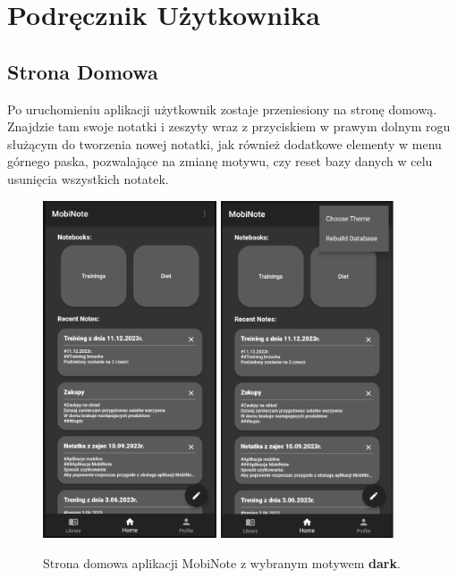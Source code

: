 \chapter{Podręcznik Użytkownika}

\section{Strona Domowa}

Po uruchomieniu aplikacji użytkownik zostaje przeniesiony na stronę domową. Znajdzie tam swoje notatki i zeszyty wraz z przyciskiem w prawym dolnym rogu służącym do tworzenia nowej notatki, jak również dodatkowe elementy w menu górnego paska, pozwalające na zmianę motywu, czy reset bazy danych w celu usunięcia wszystkich notatek. 

\begin{figure}[h]
    \centering
    \includegraphics[height=10cm]{images/strona_domowa.png}
    \quad\quad
    \includegraphics[height=10cm]{images/strona_domowa_opcje.png}
    \caption{Strona domowa aplikacji MobiNote z wybranym motywem \textbf{dark}.}
\end{figure}


